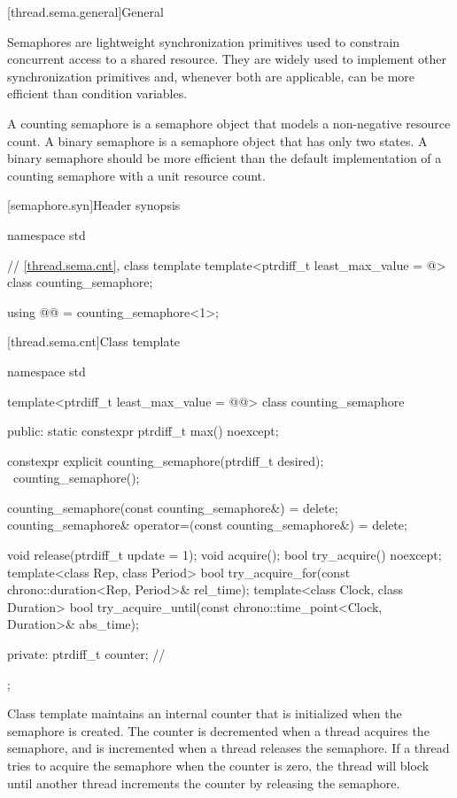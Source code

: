 [thread.sema.general]{General}

\pnum
Semaphores are lightweight synchronization primitives
used to constrain concurrent access to a shared resource.
They are widely used to implement other synchronization primitives and,
whenever both are applicable, can be more efficient than condition variables.

\pnum
A counting semaphore is a semaphore object
that models a non-negative resource count.
A binary semaphore is a semaphore object that has only two states.
A binary semaphore should be more efficient than
the default implementation of a counting semaphore with a unit resource count.

[semaphore.syn]{Header  synopsis}

%
\begin{codeblock}
namespace std {
  // \ref{thread.sema.cnt}, class template 
  template<ptrdiff_t least_max_value = @\impdef@>
    class counting_semaphore;

  using @@ = counting_semaphore<1>;
}
\end{codeblock}

[thread.sema.cnt]{Class template }

\begin{codeblock}
namespace std {
  template<ptrdiff_t least_max_value = @@>
  class counting_semaphore {
  public:
    static constexpr ptrdiff_t max() noexcept;

    constexpr explicit counting_semaphore(ptrdiff_t desired);
    ~counting_semaphore();

    counting_semaphore(const counting_semaphore&) = delete;
    counting_semaphore& operator=(const counting_semaphore&) = delete;

    void release(ptrdiff_t update = 1);
    void acquire();
    bool try_acquire() noexcept;
    template<class Rep, class Period>
      bool try_acquire_for(const chrono::duration<Rep, Period>& rel_time);
    template<class Clock, class Duration>
      bool try_acquire_until(const chrono::time_point<Clock, Duration>& abs_time);

  private:
    ptrdiff_t counter;          // \expos
  };
}
\end{codeblock}

\pnum
{}%
Class template  maintains an internal counter
that is initialized when the semaphore is created.
The counter is decremented when a thread acquires the semaphore, and
is incremented when a thread releases the semaphore.
If a thread tries to acquire the semaphore when the counter is zero,
the thread will block
until another thread increments the counter by releasing the semaphore.

